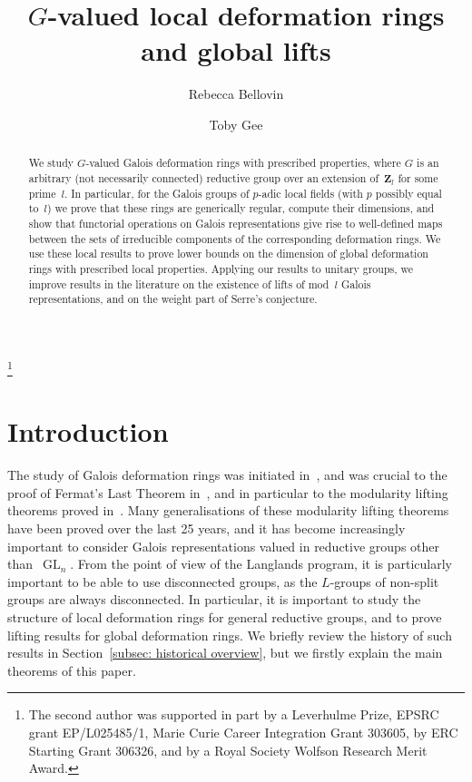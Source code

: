 \documentclass{amsart}
\renewcommand{\mathbb}{\mathbf}
\renewcommand{\ell}{l}
\theoremstyle{definition}
\theoremstyle{remark}
\newcommand{\Z}{\ZZ}
\newcommand{\ZZ}{{\mathbb Z}}
\newcommand{\Zl}{\Z_{\ell}}
\DeclareMathOperator{\GL}{GL}
\begin{document}
\title[$G$-valued local deformation rings and global lifts]{$G$-valued
  local deformation rings and global lifts}

\author[R. Bellovin]{Rebecca Bellovin}  \address{Department of
  Mathematics, Imperial College London,
  London SW7 2AZ, UK}

\author[T. Gee]{Toby Gee}  \address{Department of
  Mathematics, Imperial College London,
  London SW7 2AZ, UK}

\thanks{The second author was
  supported in part by a Leverhulme Prize, EPSRC grant EP/L025485/1, Marie Curie Career
  Integration Grant 303605, by
  ERC Starting Grant 306326, and by a Royal Society Wolfson Research Merit Award.}

\maketitle
\begin{abstract}We study $G$-valued Galois deformation rings with
  prescribed properties, where
  $G$ is an arbitrary (not necessarily connected) reductive group over an
  extension of~$\Zl$ for some prime~$l$. In particular, for the Galois
  groups of $p$-adic local fields (with $p$ possibly equal to~$l$) we prove
  that these rings are generically regular, compute their
  dimensions, and show that functorial operations on Galois
  representations give rise to well-defined maps between the sets of irreducible
  components of the corresponding deformation rings. We use these
  local results to prove  lower bounds on the dimension of 
  global deformation rings with
  prescribed local properties. Applying our results to unitary groups, we improve results in
  the literature on
  the existence of lifts of mod~$l$ Galois representations,  and on the weight part of Serre's conjecture.
\end{abstract}
\setcounter{tocdepth}{1}
\tableofcontents
\section{Introduction}\label{sec: introduction}The study of Galois
deformation rings was initiated in~\cite{MR1012172}, and was crucial
to the proof of Fermat's Last Theorem in~\cite{MR1333035}, and in
particular to the modularity lifting theorems proved
in~\cite{MR1333035,MR1333036}. Many generalisations of these
modularity lifting theorems have been proved over the last 25 years,
and it has become increasingly important to consider Galois
representations valued in reductive groups other than~$\GL_n$. From
the point of view of the Langlands program, it is particularly
important to be able to use disconnected groups, as the $L$-groups of
non-split groups are always disconnected. In particular, it is
important to study the structure of local deformation rings for
general reductive groups, and to prove lifting results for global
deformation rings. We briefly review the history of such results in
Section~\ref{subsec: historical overview}, but we firstly explain the
main theorems of this paper.
\end{document}

